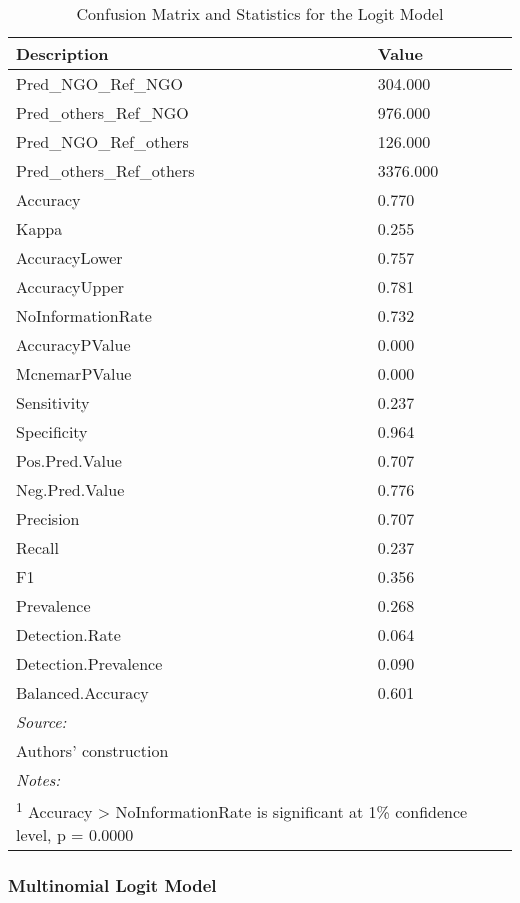 \documentclass[a4paper,nobind]{templates/ociamthesis}
\begin{document}
\begin{table}

\caption{\label{tab:unnamed-chunk-28}Confusion Matrix and Statistics for the Logit Model}
\centering
\begin{tabular}[t]{ll}
\toprule
Description & Value\\
\midrule
Pred\_NGO\_Ref\_NGO & 304.000\\
Pred\_others\_Ref\_NGO & 976.000\\
Pred\_NGO\_Ref\_others & 126.000\\
Pred\_others\_Ref\_others & 3376.000\\
Accuracy & 0.770\\
\addlinespace
Kappa & 0.255\\
AccuracyLower & 0.757\\
AccuracyUpper & 0.781\\
NoInformationRate & 0.732\\
AccuracyPValue & 0.000\\
\addlinespace
McnemarPValue & 0.000\\
Sensitivity & 0.237\\
Specificity & 0.964\\
Pos.Pred.Value & 0.707\\
Neg.Pred.Value & 0.776\\
\addlinespace
Precision & 0.707\\
Recall & 0.237\\
F1 & 0.356\\
Prevalence & 0.268\\
Detection.Rate & 0.064\\
\addlinespace
Detection.Prevalence & 0.090\\
Balanced.Accuracy & 0.601\\
\bottomrule
\multicolumn{2}{l}{\rule{0pt}{1em}\textit{Source: }}\\
\multicolumn{2}{l}{\rule{0pt}{1em}Authors' construction}\\
\multicolumn{2}{l}{\rule{0pt}{1em}\textit{Notes: }}\\
\multicolumn{2}{l}{\rule{0pt}{1em}\textsuperscript{1} Accuracy > NoInformationRate is significant at 1\% confidence level, p = 0.0000}\\
\end{tabular}
\end{table}

\hypertarget{multinomial-logit-model-1}{%
\subsubsection{Multinomial Logit Model}\label{multinomial-logit-model-1}}
\end{document}
